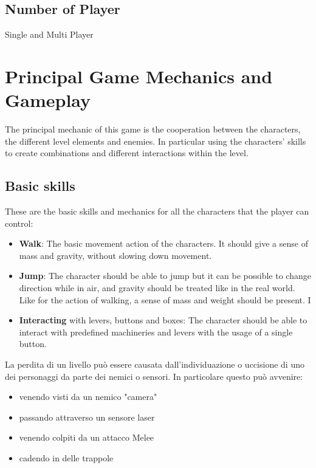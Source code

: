 \documentclass[12pt, a4paper]{report}
\begin{document}
\section*{Number of Player}
Single and Multi Player

\chapter{Principal Game Mechanics and Gameplay}
The principal mechanic of this game is the cooperation between the characters, the different level elements and enemies. In particular using the characters’ skills to create combinations and different interactions within the level.

\section*{Basic skills}
These are the basic skills and mechanics for all the characters that the player can control:
\begin{itemize}
	\item \textbf{Walk}: The basic movement action of the characters. It should give a sense of mass and gravity, without slowing down movement.
	\item \textbf{Jump}: The character should be able to jump but it can be possible to change direction while in air, and gravity should be treated like in the real world. Like for the action of walking, a sense of mass and weight should be present. 
	I\item \textbf{Interacting} with levers, buttons and boxes: The character should be able to interact with predefined machineries and levers with the usage of a single button.
\end{itemize}
La perdita di un livello può essere causata dall'individuazione o uccisione di uno dei personaggi da parte dei nemici o sensori. In particolare questo può avvenire:
\begin{itemize}
	\item venendo visti da un nemico "camera"
	\item passando attraverso un sensore laser
	\item venendo colpiti da un attacco Melee
	\item cadendo in delle trappole
\end{itemize}
\end{document}
